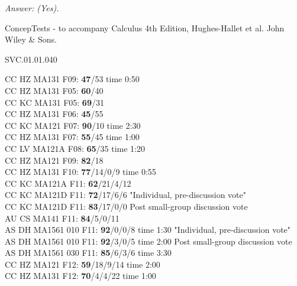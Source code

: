 {\it Answer: (Yes).} 

\medskip

\medskip
ConcepTests - to accompany Calculus 4th Edition, Hughes-Hallet et al. John Wiley \& Sons.

SVC.01.01.040


CC HZ MA131 F09: {\bf 47}/53 time 0:50  \\
CC HZ MA131 F05: {\bf60}/40\\
CC KC MA131 F05: {\bf69}/31 \\
CC HZ MA131 F06: {\bf 45}/55 \\
CC KC MA121 F07: {\bf 90}/10 time 2:30 \\ 
CC HZ MA131 F07: {\bf 55}/45 time 1:00 \\ 
CC LV MA121A F08: {\bf 65}/35 time 1:20 \\
CC HZ MA121 F09: {\bf 82}/18  \\
CC HZ MA131 F10: {\bf 77}/14/0/9 time 0:55  \\
CC KC MA121A F11: {\bf 62}/21/4/12  \\
CC KC MA121D F11: {\bf 72}/17/6/6 "Individual, pre-discussion vote" \\
CC KC MA121D F11: {\bf 83}/17/0/0 Post small-group discussion vote \\
AU CS MA141 F11: {\bf 84}/5/0/11  \\
AS DH MA1561 010 F11: {\bf 92}/0/0/8 time 1:30 "Individual, pre-discussion vote" \\
AS DH MA1561 010 F11: {\bf 92}/3/0/5 time 2:00 Post small-group discussion vote \\
AS DH MA1561 030 F11: {\bf 85}/6/3/6 time 3:30  \\
CC HZ MA121 F12: {\bf 59}/18/9/14 time 2:00  \\
CC HZ MA131 F12: {\bf 70}/4/4/22 time 1:00  \\
